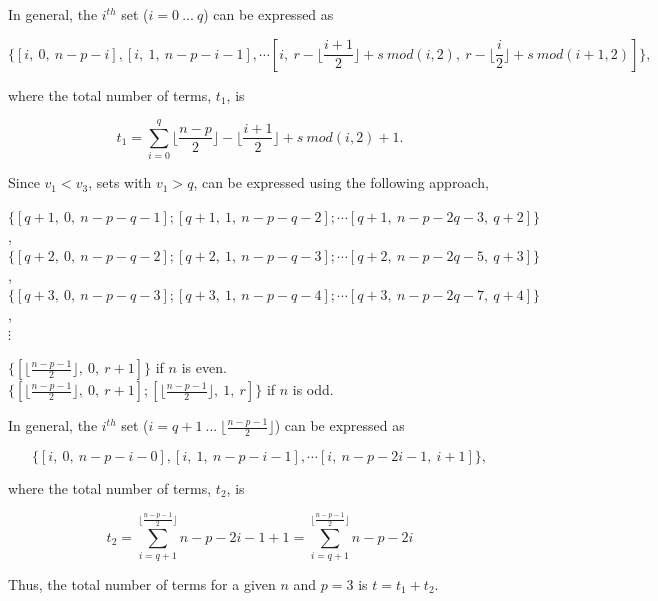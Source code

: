 \documentclass[3p,times]{elsarticle}
\begin{document}
In general, the $i^{th}$ set ($i=0\ ...\ q$) can be expressed as 

\begin{equation}
\{[i,\ 0,\ n-p-i], [i,\ 1,\ n-p-i-1], \cdots [i,\ r-\lfloor \frac{i+1}{2}\rfloor+s\ mod(i,2),\ r-\lfloor \frac{i}{2}\rfloor+s\ mod(i+1,2)]\},
\end{equation}

where the total number of terms, $t_1$, is

\begin{equation}
t_1=\sum_{i=0}^{q} \lfloor\frac{n-p}{2}\rfloor-\lfloor\frac{i+1}{2}\rfloor+s\ mod(i,2)+1.
\end{equation}

Since $v_1<v_3$, sets with $v_1>q$, can be expressed using the following approach,

\begin{center}
$\{[q+1,\ 0,\ n-p-q-1]; [q+1,\ 1,\ n-p-q-2]; \cdots [q+1,\ n-p-2q-3,\ q+2]\}$,\\
$\{[q+2,\ 0,\ n-p-q-2]; [q+2,\ 1,\ n-p-q-3]; \cdots [q+2,\ n-p-2q-5,\ q+3]\}$,\\
$\{[q+3,\ 0,\ n-p-q-3]; [q+3,\ 1,\ n-p-q-4]; \cdots [q+3,\ n-p-2q-7,\ q+4]\}$,\\
$\vdots$ \\
\end{center}

\begin{center}
$\{[\lfloor\frac{n-p-1}{2}\rfloor,\ 0,\ r+1]\}$ if $n$ is even.\\
$\{[\lfloor\frac{n-p-1}{2}\rfloor,\ 0,\ r+1]; [\lfloor\frac{n-p-1}{2}\rfloor,\ 1,\ r]\}$ if $n$ is odd.
\end{center} 

In general, the $i^{th}$ set ($i=q+1\ ...\ \lfloor\frac{n-p-1}{2}\rfloor$) can be expressed as 

\begin{equation}
\{[i,\ 0,\ n-p-i-0], [i,\ 1,\ n-p-i-1], \cdots [i,\ n-p-2i-1,\ i+1]\},
\end{equation}

where the total number of terms, $t_2$, is

\begin{equation}
t_2=\sum_{i=q+1}^{\lfloor\frac{n-p-1}{2}\rfloor} n-p-2i-1+1 =\sum_{i=q+1}^{\lfloor\frac{n-p-1}{2}\rfloor} n-p-2i
\end{equation}

Thus, the total number of terms for a given $n$ and $p=3$ is $t=t_1+t_2$.  
\end{document}
